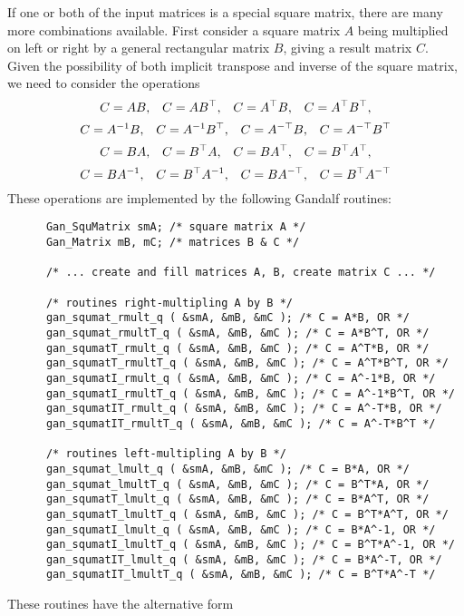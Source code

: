 If one or both of the input matrices is a special square matrix, there are
many more combinations available. First consider a square matrix $A$ being
multiplied on left or right by a general rectangular matrix $B$, giving
a result matrix $C$. Given the possibility of both implicit transpose and
inverse of the square matrix, we need to consider the operations
\[ C = A B,\;\;\;C = A B^{\top},\;\;\;C = A^{\top} B,\;\;\;C = A^{\top} B^{\top},
\]
\[ C = A^{-1} B,\;\;\;C = A^{-1} B^{\top},\;\;\;C = A^{-\top} B,\;\;\;C = A^{-\top} B^{\top}
\]
\[ C = B A,\;\;\;C = B^{\top} A,\;\;\;C = B A^{\top},\;\;\;C = B^{\top} A^{\top},
\]
\[ C = B A^{-1},\;\;\;C = B^{\top} A^{-1},\;\;\;C = B A^{-\top},\;\;\;C = B^{\top} A^{-\top}
\]
These operations are implemented by the following Gandalf routines:
\begin{verbatim}
      Gan_SquMatrix smA; /* square matrix A */
      Gan_Matrix mB, mC; /* matrices B & C */

      /* ... create and fill matrices A, B, create matrix C ... */

      /* routines right-multipling A by B */
      gan_squmat_rmult_q ( &smA, &mB, &mC ); /* C = A*B, OR */
      gan_squmat_rmultT_q ( &smA, &mB, &mC ); /* C = A*B^T, OR */
      gan_squmatT_rmult_q ( &smA, &mB, &mC ); /* C = A^T*B, OR */
      gan_squmatT_rmultT_q ( &smA, &mB, &mC ); /* C = A^T*B^T, OR */
      gan_squmatI_rmult_q ( &smA, &mB, &mC ); /* C = A^-1*B, OR */
      gan_squmatI_rmultT_q ( &smA, &mB, &mC ); /* C = A^-1*B^T, OR */
      gan_squmatIT_rmult_q ( &smA, &mB, &mC ); /* C = A^-T*B, OR */
      gan_squmatIT_rmultT_q ( &smA, &mB, &mC ); /* C = A^-T*B^T */

      /* routines left-multipling A by B */
      gan_squmat_lmult_q ( &smA, &mB, &mC ); /* C = B*A, OR */
      gan_squmat_lmultT_q ( &smA, &mB, &mC ); /* C = B^T*A, OR */
      gan_squmatT_lmult_q ( &smA, &mB, &mC ); /* C = B*A^T, OR */
      gan_squmatT_lmultT_q ( &smA, &mB, &mC ); /* C = B^T*A^T, OR */
      gan_squmatI_lmult_q ( &smA, &mB, &mC ); /* C = B*A^-1, OR */
      gan_squmatI_lmultT_q ( &smA, &mB, &mC ); /* C = B^T*A^-1, OR */
      gan_squmatIT_lmult_q ( &smA, &mB, &mC ); /* C = B*A^-T, OR */
      gan_squmatIT_lmultT_q ( &smA, &mB, &mC ); /* C = B^T*A^-T */
\end{verbatim}
These routines have the alternative form
